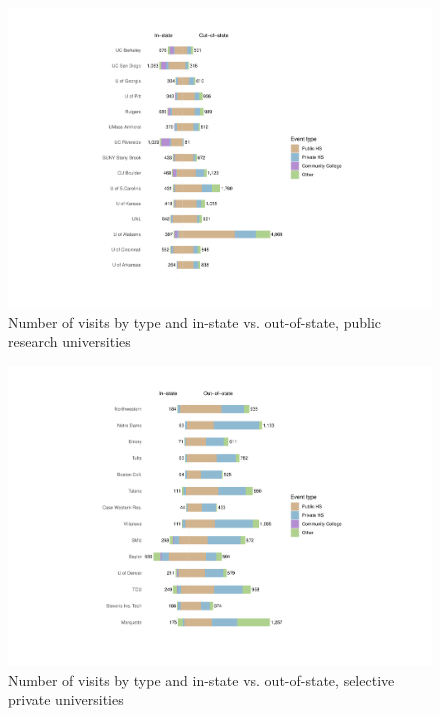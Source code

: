 \documentclass[
  12pt,
]{article}
\begin{document}
\begin{landscape}
\newpage

\begin{figure}

{\centering \includegraphics[width=2\linewidth]{./events_count_pubu} 

}

\caption{Number of visits by type and in-state vs. out-of-state, public research universities}\label{fig:events-count-pubu}
\end{figure}

\newpage

\begin{figure}

{\centering \includegraphics[width=2\linewidth]{./events_count_privu} 

}

\caption{Number of visits by type and in-state vs. out-of-state, selective private universities}\label{fig:events-count-privu}
\end{figure}


\end{landscape}
\end{document}
